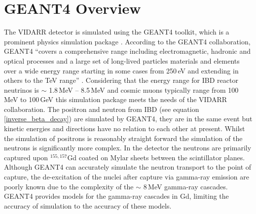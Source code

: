 \section{GEANT4 Overview}\label{sec:GEANT4Simulation_g4Overview}
The VIDARR detector is simulated using the GEANT4 toolkit, which is a prominent physics simulation package \cite{Agostinelli:2002hh}. According to the GEANT4 collaboration, GEANT4 ``covers a comprehensive range including electromagnetic, hadronic and optical processes and a large set of long-lived particles materials and elements over a wide energy range starting in some cases from 250\,eV and extending in others to the TeV range'' \cite{Agostinelli:2002hh}. Considering that the energy range for IBD reactor neutrinos is $\sim$ 1.8\,MeV -- 8.5\,MeV \cite{Mueller_2011} and cosmic muons typically range from 100\,MeV to 100\,GeV \cite{ieee_cry_2007} this simulation package meets the needs of the VIDARR collaboration. The positron and neutron from IBD (see equation \ref{inverse_beta_decay}) are simulated by GEANT4, they are in the same event but kinetic energies and directions have no relation to each other at present. Whilst the simulation of positrons is reasonably straight forward the simulation of the neutrons is significantly more complex. In the detector the neutrons are primarily captured upon $^{155,157}$Gd coated on Mylar sheets between the scintillator planes. Although GEANT4 can accurately simulate the neutron transport to the point of capture, the de-excitation of the nuclei after capture via gamma-ray emission are poorly known due to the complexity of the $\sim$ 8\,MeV gamma-ray cascades. GEANT4 provides models for the gamma-ray cascades in Gd, limiting the accuracy of simulation to the accuracy of these models.
